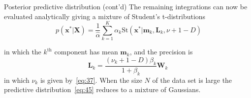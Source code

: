 \documentclass[10pt,mathserif]{beamer}
\begin{document}
\begin{frame}{Posterior predictive distribution (cont'd)}
The remaining integrations can now be evaluated analytically giving a mixture of Student's t-distributions
\begin{equation}~\label{eq:45}
    p(\bm{x}^*|\bm{X}) = \frac{1}{\hat{\alpha}}\sum_{k=1}^K\alpha_k\text{St}(\bm{x}^*|\bm{m}_k,\bm{L}_k,\nu + 1 -D)
\end{equation}

in which the $k^{\text{th}}$ component has mean $\bm{m}_k$, and the precision is
\begin{equation}
    \bm{L}_k = \frac{(\nu_k +1 -D)\beta_k}{1+\beta_k}\bm{W}_k
\end{equation}
in which $\nu_k$ is given by~\eqref{eq:37}. When the size $
N$ of the data set is large the predictive distribution~\eqref{eq:45} reduces to a mixture of Gaussians.
\end{frame}
\end{document}
